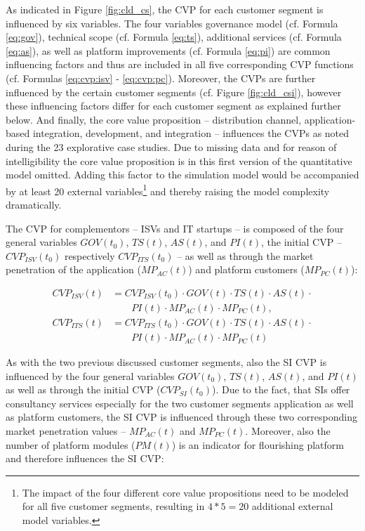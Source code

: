 As indicated in Figure \ref{fig:cld_cs}, the \ac{CVP} for each customer segment is influenced by six variables. The four variables governance model (cf. Formula \ref{eq:gov}), technical scope (cf. Formula \ref{eq:ts}), additional services (cf. Formula \ref{eq:as}), as well as platform improvements (cf. Formula \ref{eq:pi}) are common influencing factors and thus are included in all five corresponding \ac{CVP} functions (cf. Formulas \ref{eq:cvp:isv} - \ref{eq:cvp:pc}). Moreover, the \acp{CVP} are further influenced by the certain customer segments (cf. Figure \ref{fig:cld_csi}), however these influencing factors differ for each customer segment as explained further below. And finally, the core value proposition -- distribution channel, application-based integration, development, and integration -- influences the \acp{CVP} as noted during the 23 explorative case studies. Due to missing data and for reason of intelligibility the core value proposition is in this first version of the quantitative model omitted. Adding this factor to the simulation model would be accompanied by at least 20 external variables\footnote{The impact of the four different core value propositions need to be modeled for all five customer segments, resulting in $4*5=20$ additional external model variables.} and thereby raising the model complexity dramatically.

The \ac{CVP} for complementors -- \acp{ISV} and \ac{IT} startups -- is composed of the four general variables $GOV(t_0)$, $TS(t)$, $AS(t)$, and $PI(t)$, the initial \ac{CVP} -- $CVP_{ISV}(t_0)$ respectively $ CVP_{ITS}(t_0)$ -- as well as through the market penetration of the application ($MP_{AC}(t)$) and platform customers ($MP_{PC}(t)$):

\begin{align}
		CVP_{ISV}(t) &= CVP_{ISV}(t_0) \cdot GOV(t) \cdot TS(t) \cdot AS(t) \cdot \nonumber \\ &\qquad PI(t) \cdot MP_{AC}(t) \cdot MP_{PC}(t),\label{eq:cvp:isv}\\
		CVP_{ITS}(t) &= CVP_{ITS}(t_0) \cdot GOV(t) \cdot TS(t) \cdot AS(t) \cdot \nonumber \\ &\qquad PI(t) \cdot MP_{AC}(t) \cdot MP_{PC}(t)\label{eq:cvp:its}
\end{align}

As with the two previous discussed customer segments, also the \ac{SI} \ac{CVP} is influenced by the four general variables $GOV(t_0)$, $TS(t)$, $AS(t)$, and $PI(t)$ as well as through the initial \ac{CVP} ($CVP_{SI}(t_0)$). Due to the fact, that \acp{SI} offer consultancy services especially for the two customer segments application as well as platform customers, the \ac{SI} \ac{CVP} is influenced through these two corresponding market penetration values -- $MP_{AC}(t)$ and $MP_{PC}(t)$. Moreover, also the number of platform modules ($PM(t)$) is an indicator for flourishing platform and therefore influences the \ac{SI} \ac{CVP}:

